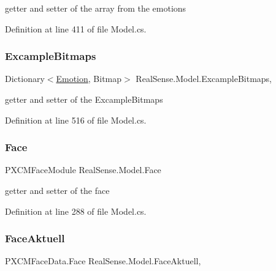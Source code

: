 getter and setter of the array from the emotions 

Definition at line 411 of file Model.\+cs.

\mbox{\label{class_real_sense_1_1_model_afbdadf185ba37319705fd55d102c0cb4}} 
\subsubsection{\texorpdfstring{Excample\+Bitmaps}{ExcampleBitmaps}}
{\footnotesize\ttfamily Dictionary$<$\hyperlink{class_real_sense_1_1_model_a5bf3fde8f53519f7a740d8b4e0399208}{Emotion}, Bitmap$>$ Real\+Sense.\+Model.\+Excample\+Bitmaps\hspace{0.3cm}{\ttfamily [get]}, {\ttfamily [set]}}

getter and setter of the Excample\+Bitmaps 

Definition at line 516 of file Model.\+cs.

\mbox{\label{class_real_sense_1_1_model_abb8701f1030ca1e3bfd226a9ad352da5}} 
\subsubsection{\texorpdfstring{Face}{Face}}
{\footnotesize\ttfamily P\+X\+C\+M\+Face\+Module Real\+Sense.\+Model.\+Face\hspace{0.3cm}{\ttfamily [get]}}

getter and setter of the face 

Definition at line 288 of file Model.\+cs.

\mbox{\label{class_real_sense_1_1_model_a3621c14d22c3709775971fed725c2781}} 
\subsubsection{\texorpdfstring{Face\+Aktuell}{FaceAktuell}}
{\footnotesize\ttfamily P\+X\+C\+M\+Face\+Data.\+Face Real\+Sense.\+Model.\+Face\+Aktuell\hspace{0.3cm}{\ttfamily [get]}, {\ttfamily [set]}}

